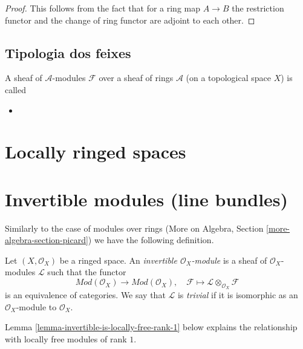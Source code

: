 \begin{proof}
This follows from the fact that for a ring map
$A \to B$ the restriction functor and the change
of ring functor are adjoint to each other.
\end{proof}

\subsection{Tipologia dos feixes}
\label{subsection-tipologia-dos-feixes}

\begin{definition}
\label{definition-tipologia-dos-feixes}
A sheaf of $\mathcal{A}$-modules $\mathcal{F}$ over a sheaf of rings 
$\mathcal{A}$ (on a topological space $X$) is called
\begin{itemize}
\item 
\end{itemize}
\end{definition}


\section{Locally ringed spaces}
\label{section-locally-ringed-spaces}


\section{Invertible modules (line bundles)}
\label{section-invertible}

\noindent
Similarly to the case of modules over rings
(More on Algebra, Section \ref{more-algebra-section-picard})
we have the following definition.

\begin{definition}
\label{definition-invertible}
Let $(X, \mathcal{O}_X)$ be a ringed space. An
{\it invertible $\mathcal{O}_X$-module} is a sheaf
of $\mathcal{O}_X$-modules $\mathcal{L}$ such that
the functor
$$
\textit{Mod}(\mathcal{O}_X) \longrightarrow \textit{Mod}(\mathcal{O}_X),\quad
\mathcal{F} \longmapsto \mathcal{L} \otimes_{\mathcal{O}_X} \mathcal{F}
$$
is an equivalence of categories. We say that $\mathcal{L}$ is
{\it trivial} if it is isomorphic as an $\mathcal{O}_X$-module
to $\mathcal{O}_X$.
\end{definition}

\noindent
Lemma \ref{lemma-invertible-is-locally-free-rank-1}
below explains the relationship with locally free modules
of rank $1$.

